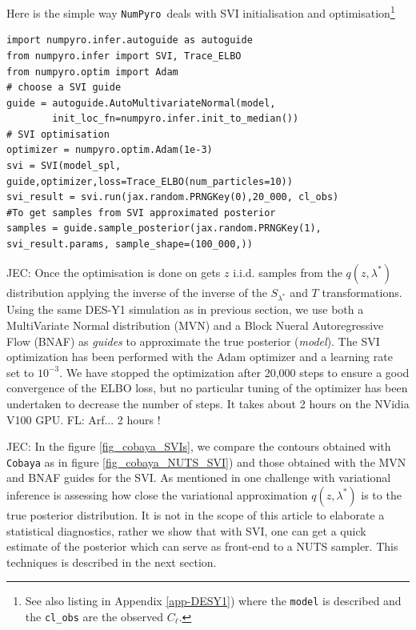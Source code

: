 \documentclass[twocolumn,twocolappendix,nofootinbib,iop]{openjournal}
\newcommand{\FrL}[1]{{\color{cyan}FL: #1}}
\newcommand{\JEC}[1]{{\color{magenta}JEC: #1}}
\newcommand{\numpyro}{\texttt{NumPyro}}
\begin{document}
Here is the simple way \numpyro\ deals with SVI initialisation and optimisation\footnote{See also listing in Appendix \ref{app-DESY1}) where the \texttt{model} is described and the \texttt{cl\_obs} are the observed $C_\ell$.}
\begin{lstlisting}[language=iPython]
import numpyro.infer.autoguide as autoguide
from numpyro.infer import SVI, Trace_ELBO
from numpyro.optim import Adam
# choose a SVI guide 
guide = autoguide.AutoMultivariateNormal(model,
        init_loc_fn=numpyro.infer.init_to_median())
# SVI optimisation 
optimizer = numpyro.optim.Adam(1e-3)
svi = SVI(model_spl, guide,optimizer,loss=Trace_ELBO(num_particles=10))
svi_result = svi.run(jax.random.PRNGKey(0),20_000, cl_obs)
#To get samples from SVI approximated posterior 
samples = guide.sample_posterior(jax.random.PRNGKey(1), svi_result.params, sample_shape=(100_000,))
\end{lstlisting}
%
\JEC{Once the optimisation is done on gets $z$ i.i.d. samples from the $q(z,\lambda^\ast)$ distribution  applying the inverse of the inverse of the $S_{\lambda^\ast}$ and $T$ transformations. Using the same DES-Y1 simulation as in previous section, we use both a MultiVariate Normal distribution (MVN) and a Block Nueral Autoregressive Flow (BNAF) \citep{pmlr-v115-de-cao20a} as \textit{guides} to approximate the true posterior (\textit{model}). The SVI optimization has been performed with the Adam optimizer \citep{2014arXiv1412.6980K} and a learning rate set to $10^{-3}$. We have stopped the optimization after 20,000 steps to ensure a good convergence of the ELBO loss, but no particular tuning of the optimizer has been undertaken to decrease the number of steps. It takes about 2 hours on the NVidia V100 GPU}.  \FrL{Arf... 2 hours !} 

\JEC{
In the figure \ref{fig_cobaya_SVIs}, we compare the contours obtained with \texttt{Cobaya} as in figure \ref{fig_cobaya_NUTS_SVI}) and those obtained with the MVN and BNAF guides for the SVI.  As mentioned in \cite{NEURIPS2020_7cac11e2} one challenge with variational inference is assessing how close the variational approximation $q(z,\lambda^\ast)$ is to the true posterior distribution. It is not in the scope of this article to elaborate a statistical diagnostics, rather we show that with SVI, one can get a quick estimate of the posterior which can serve as front-end to a NUTS sampler. This techniques is described in the next section.} 
\end{document}
